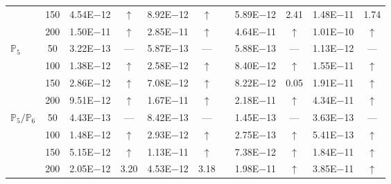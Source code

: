 \begin{table}[H]
{\begin{tabular}{@{}l c c c c c c c c c c@{}}
 & 150 & 4.54E$-$12 & $\uparrow$  & 8.92E$-$12 & $\uparrow$ &  & 5.89E$-$12 & 2.41 & 1.48E$-$11 & 1.74\\
 & 200 & 1.50E$-$11 & $\uparrow$  & 2.85E$-$11 & $\uparrow$ &  & 4.64E$-$11 & $\uparrow$ & 1.01E$-$10 & $\uparrow$\\
\midrule
\multirow{4}{*}{$\mathbb{P}_{5}$}
 & 50 & 3.22E$-$13 & ---  & 5.87E$-$13 & --- &  & 5.88E$-$13 & --- & 1.13E$-$12 & ---\\
 & 100 & 1.38E$-$12 & $\uparrow$  & 2.58E$-$12 & $\uparrow$ &  & 8.40E$-$12 & $\uparrow$ & 1.55E$-$11 & $\uparrow$\\
 & 150 & 2.86E$-$12 & $\uparrow$  & 7.08E$-$12 & $\uparrow$ &  & 8.22E$-$12 & 0.05 & 1.91E$-$11 & $\uparrow$\\
 & 200 & 9.51E$-$12 & $\uparrow$  & 1.67E$-$11 & $\uparrow$ &  & 2.18E$-$11 & $\uparrow$ & 4.34E$-$11 & $\uparrow$\\
\midrule
\multirow{4}{*}{$\mathbb{P}_{5}/\mathbb{P}_{6}$}
 & 50 & 4.43E$-$13 & ---  & 8.42E$-$13 & --- &  & 1.45E$-$13 & --- & 3.63E$-$13 & ---\\
 & 100 & 1.48E$-$12 & $\uparrow$  & 2.93E$-$12 & $\uparrow$ &  & 2.75E$-$13 & $\uparrow$ & 5.41E$-$13 & $\uparrow$\\
 & 150 & 5.15E$-$12 & $\uparrow$  & 1.13E$-$11 & $\uparrow$ &  & 7.38E$-$12 & $\uparrow$ & 1.84E$-$11 & $\uparrow$\\
 & 200 & 2.05E$-$12 & 3.20  & 4.53E$-$12 & 3.18 &  & 1.98E$-$11 & $\uparrow$ & 3.85E$-$11 & $\uparrow$\\
\bottomrule
\end{tabular}}
\label{none}
\end{table}
